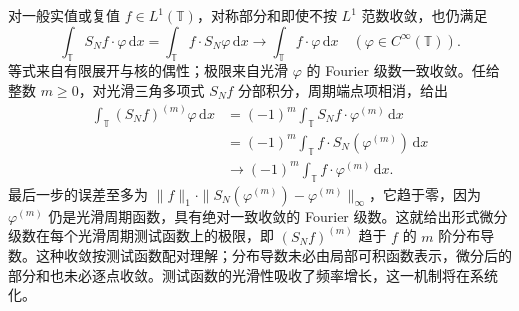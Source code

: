 \ProseParagraphBreak

对一般实值或复值 \(f\in L^1(\mathbb T)\)，对称部分和即使不按 \(L^1\) 范数收敛，也仍满足
\[
 \int_{\mathbb T}S_Nf\cdot\varphi\,\mathrm{d}x
 =\int_{\mathbb T}f\cdot S_N\varphi\,\mathrm{d}x
 \longrightarrow\int_{\mathbb T}f\cdot\varphi\,\mathrm{d}x
 \quad(\varphi\in C^\infty(\mathbb T)).
\]
等式来自有限展开与核的偶性；极限来自光滑 \(\varphi\) 的 Fourier 级数一致收敛。任给整数 \(m\geq0\)，对光滑三角多项式 \(S_Nf\) 分部积分，周期端点项相消，给出
\[
 \begin{aligned}
 \int_{\mathbb T}(S_Nf)^{(m)}\varphi\,\mathrm dx
 &=(-1)^m\int_{\mathbb T}S_Nf\cdot\varphi^{(m)}\,\mathrm dx\\
 &=(-1)^m\int_{\mathbb T}f\cdot S_N(\varphi^{(m)})\,\mathrm dx\\
 &\longrightarrow(-1)^m\int_{\mathbb T}f\cdot\varphi^{(m)}\,\mathrm dx.
 \end{aligned}
\]
最后一步的误差至多为
\(\|f\|_1\cdot\|S_N(\varphi^{(m)})-\varphi^{(m)}\|_\infty\)，它趋于零，因为 \(\varphi^{(m)}\) 仍是光滑周期函数，具有绝对一致收敛的 Fourier 级数。这就给出形式微分级数在每个光滑周期测试函数上的极限，即 \((S_Nf)^{(m)}\) 趋于 \(f\) 的 \(m\) 阶分布导数。这种收敛按测试函数配对理解；分布导数未必由局部可积函数表示，微分后的部分和也未必逐点收敛。测试函数的光滑性吸收了频率增长，这一机制将在系统化。
